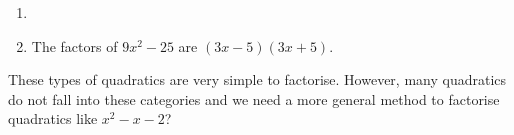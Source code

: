 {\begin{mdframed}[linewidth=4, leftmargin=40, rightmargin=40]
\begin{exercise}
\begin{enumerate}[noitemsep, label=\textbf{Step} \textbf{\arabic*}. ]
{\begin{minipage}{\columnwidth}
    \parbox[t]{\mymathboxwidth}{\large$
    9{x}^{2}-25={\left(3x\right)}^{2}-{5}^{2}$}\hfill
    \parbox[t]{48pt}{\raggedleft 
    (8.23)}
    \end{minipage}\vspace{12pt}\par
    }%
      \item  
      \label{m39394*id275517}\nopagebreak\noindent{}
      \item  
      \label{m39394*id275585}The factors of $9{x}^{2}-25$\hspace{1ex} are $\left(3x-5\right)\left(3x+5\right)$. \par 
      \end{enumerate}
    \end{exercise}
    \end{mdframed}
    }
    \noindent
      \label{m39394*id275654}These types of quadratics are very simple to factorise. However, many quadratics do not fall into these categories and we need a more general method to factorise quadratics like ${x}^{2}-x-2$\hspace{1ex}?\par 
